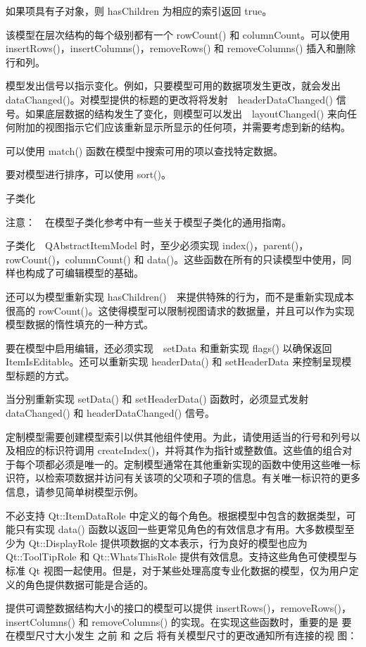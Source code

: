 如果项具有子对象，则 hasChildren 为相应的索引返回 true。

该模型在层次结构的每个级别都有一个 rowCount() 和 columnCount。可以使用 insertRows()，insertColumns()，removeRows() 和 removeColumns() 插入和删除行和列。

模型发出信号以指示变化。例如，只要模型可用的数据项发生更改，就会发出 dataChanged()。对模型提供的标题的更改将将发射　headerDataChanged() 信号。如果底层数据的结构发生了变化，则模型可以发出　layoutChanged() 来向任何附加的视图指示它们应该重新显示所显示的任何项，并需要考虑到新的结构。

可以使用 match() 函数在模型中搜索可用的项以查找特定数据。

要对模型进行排序，可以使用 sort()。

\splitLine

子类化

注意：　在模型子类化参考中有一些关于模型子类化的通用指南。

子类化　QAbstractItemModel 时，至少必须实现 index()，parent()，rowCount()，columnCount() 和 data()。这些函数在所有的只读模型中使用，同样也构成了可编辑模型的基础。

还可以为模型重新实现 hasChildren()　来提供特殊的行为，而不是重新实现成本很高的 rowCount()。这使得模型可以限制视图请求的数据量，并且可以作为实现模型数据的惰性填充的一种方式。

要在模型中启用编辑，还必须实现　setData 和重新实现 flags() 以确保返回 ItemIsEditable。还可以重新实现 headerData() 和 setHeaderData 来控制呈现模型标题的方式。

当分别重新实现 setData() 和 setHeaderData() 函数时，必须显式发射　dataChanged() 和 headerDataChanged() 信号。

定制模型需要创建模型索引以供其他组件使用。为此，请使用适当的行号和列号以及相应的标识符调用 createIndex()，并将其作为指针或整数值。这些值的组合对于每个项都必须是唯一的。定制模型通常在其他重新实现的函数中使用这些唯一标识符，以检索项数据并访问有关该项的父项和子项的信息。有关唯一标识符的更多信息，请参见简单树模型示例。

不必支持 Qt::ItemDataRole 中定义的每个角色。根据模型中包含的数据类型，可能只有实现 data() 函数以返回一些更常见角色的有效信息才有用。大多数模型至少为 Qt::DisplayRole 提供项数据的文本表示，行为良好的模型也应为 Qt::ToolTipRole 和 Qt::WhatsThisRole 提供有效信息。支持这些角色可使模型与标准 Qt 视图一起使用。但是，对于某些处理高度专业化数据的模型，仅为用户定义的角色提供数据可能是合适的。

提供可调整数据结构大小的接口的模型可以提供 insertRows()，removeRows()，
insertColumns() 和 removeColumns() 的实现。在实现这些函数时，重要的是
要在模型尺寸大小发生 之前 和 之后 将有关模型尺寸的更改通知所有连接的视
图：

